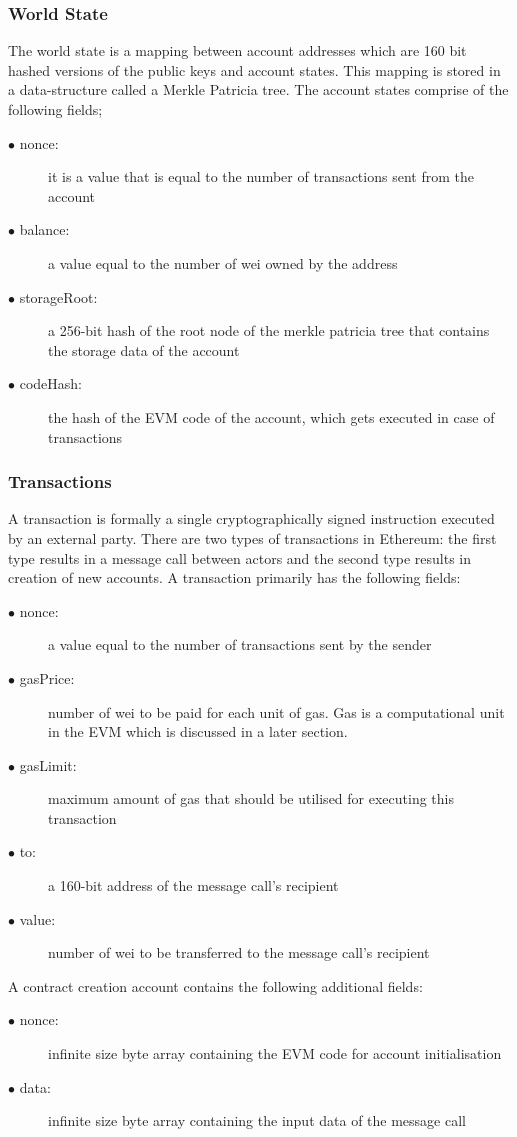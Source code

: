 \documentclass[a4paper,twoside,phd]{BYUPhys}
\begin{document}
\subsubsection{World State}
The world state is a mapping between account addresses which are 160 bit hashed versions of the public keys and account states. This mapping is stored in a data-structure called a Merkle Patricia tree. The account states comprise of the following fields;
\begin{description}
\item[$\bullet$ nonce:] it is a value that is equal to the number of transactions sent from the account
\item[$\bullet$ balance:] a value equal to the number of wei owned by the address
\item[$\bullet$ storageRoot:] a 256-bit hash of the root node of the merkle patricia tree that contains the storage data of the account
\item[$\bullet$ codeHash:] the hash of the EVM code of the account, which gets executed in case of transactions
\end{description}
\subsubsection{Transactions}
A transaction is formally a single cryptographically signed instruction executed by an external party. There are two types of transactions in Ethereum: the first type results in a message call between actors and the second type results in creation of new accounts. A transaction primarily has the following fields:
\begin{description}
\item[$\bullet$ nonce:] a value equal to the number of transactions sent by the sender
\item[$\bullet$ gasPrice:] number of wei to be paid for each unit of gas. Gas is a computational unit in the EVM which is discussed in a later section.
\item[$\bullet$ gasLimit:] maximum amount of gas that should be utilised for executing this transaction
\item[$\bullet$ to:] a 160-bit address of the message call's recipient 
\item[$\bullet$ value:] number of wei to be transferred to the message call's recipient
\end{description}
A contract creation account contains the following additional fields:
\begin{description}
\item[$\bullet$ nonce:] infinite size byte array containing the EVM code for account initialisation
\item[$\bullet$ data:] infinite size byte array containing the input data of the message call
\end{description}
\begin{description}
\item[]
\end{description}
\end{document}
